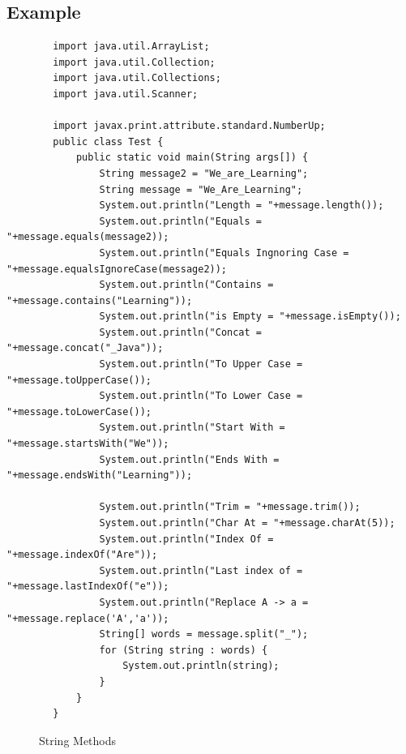 \documentclass[openany]{book}  %
\begin{document}
\subsection{Example}
\begin{center}
    \begin{verbatim}
        import java.util.ArrayList;
        import java.util.Collection;
        import java.util.Collections;
        import java.util.Scanner;

        import javax.print.attribute.standard.NumberUp;
        public class Test {
            public static void main(String args[]) {
                String message2 = "We_are_Learning";
                String message = "We_Are_Learning";
                System.out.println("Length = "+message.length());
                System.out.println("Equals = "+message.equals(message2));
                System.out.println("Equals Ingnoring Case = "+message.equalsIgnoreCase(message2));
                System.out.println("Contains = "+message.contains("Learning"));
                System.out.println("is Empty = "+message.isEmpty());
                System.out.println("Concat = "+message.concat("_Java"));
                System.out.println("To Upper Case = "+message.toUpperCase());
                System.out.println("To Lower Case = "+message.toLowerCase());
                System.out.println("Start With = "+message.startsWith("We"));
                System.out.println("Ends With = "+message.endsWith("Learning"));

                System.out.println("Trim = "+message.trim());
                System.out.println("Char At = "+message.charAt(5));
                System.out.println("Index Of = "+message.indexOf("Are"));
                System.out.println("Last index of = "+message.lastIndexOf("e"));
                System.out.println("Replace A -> a = "+message.replace('A','a'));
                String[] words = message.split("_");
                for (String string : words) {
                    System.out.println(string);
                }
            }
        }
    \end{verbatim}
\end{center}
% 
% 
\begin{figure}[htbp]
    \begin{center}
        \caption{String Methods\cite{Ref3}}
    \end{center}
\end{figure}
% 
% 
\end{document}
